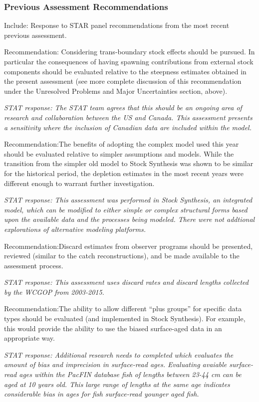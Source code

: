 \documentclass[12pt,]{article}
\begin{document}
\subsubsection{Previous Assessment
Recommendations}\label{previous-assessment-recommendations}

Include: Response to STAR panel recommendations from the most recent
previous assessment.

Recommendation: Considering trans-boundary stock effects should be
pursued. In particular the consequences of having spawning contributions
from external stock components should be evaluated relative to the
steepness estimates obtained in the present assessment (see more
complete discussion of this recommendation under the Unresolved Problems
and Major Uncertainties section, above).

\emph{STAT response: The STAT team agrees that this should be an ongoing
area of research and collaboration between the US and Canada. This
assessment presents a sensitivity where the inclusion of Canadian data
are included within the model.}

Recommendation:The benefits of adopting the complex model used this year
should be evaluated relative to simpler assumptions and models. While
the transition from the simpler old model to Stock Synthesis was shown
to be similar for the historical period, the depletion estimates in the
most recent years were different enough to warrant further
investigation.

\emph{STAT response: This assessment was performed in Stock Synthesis,
an integrated model, which can be modified to either simple or complex
structural forms based upon the available data and the processes being
modeled. There were not addtional explorations of alternative modeling
platforms.}

Recommendation:Discard estimates from observer programs should be
presented, reviewed (similar to the catch reconstructions), and be made
available to the assessment process.

\emph{STAT response: This assessment uses discard rates and discard
lengths collected by the WCGOP from 2003-2015.}

Recommendation:The ability to allow different ``plus groups'' for
specific data types should be evaluated (and implemented in Stock
Synthesis). For example, this would provide the ability to use the
biased surface-aged data in an appropriate way.

\emph{STAT response: Additional research needs to completed which
evaluates the amount of bias and imprecision in surface-read ages.
Evaluating avaiable surface-read ages within the PacFIN database fish of
lengths between 23-44 cm can be aged at 10 years old. This large range
of lengths at the same age indicates considerable bias in ages for fish
surface-read younger aged fish.}
\end{document}
